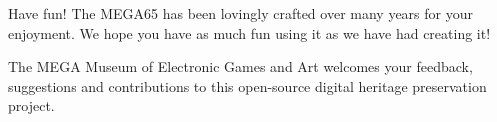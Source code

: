 Have fun! The MEGA65 has been lovingly crafted over many years for your enjoyment. We hope you have as much fun using it as we have had creating it!

The MEGA Museum of Electronic Games and Art welcomes your feedback, suggestions and contributions to this open-source digital heritage preservation project.
